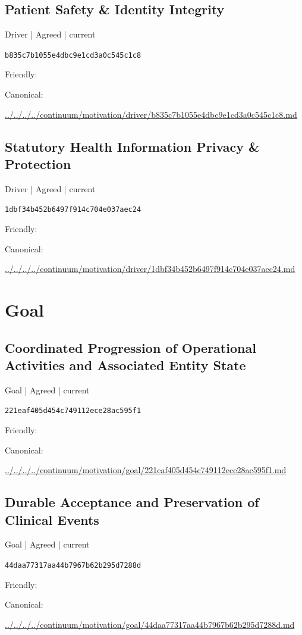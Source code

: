 \documentclass[10pt,a4paper]{article}
\begin{document}
\subsection*{Patient Safety \& Identity Integrity}
{\small Driver | Agreed | current}\par
\texttt{b835c7b1055e4dbc9e1cd3a0c545c1c8}\par
Friendly: \par
Canonical: \par
{\footnotesize\url{../../../../continuum/motivation/driver/b835c7b1055e4dbc9e1cd3a0c545c1c8.md}}\par
\subsection*{Statutory Health Information Privacy \& Protection}
{\small Driver | Agreed | current}\par
\texttt{1dbf34b452b6497f914c704e037aec24}\par
Friendly: \par
Canonical: \par
{\footnotesize\url{../../../../continuum/motivation/driver/1dbf34b452b6497f914c704e037aec24.md}}\par
\section*{Goal}
\subsection*{Coordinated Progression of Operational Activities and Associated Entity State}
{\small Goal | Agreed | current}\par
\texttt{221eaf405d454c749112ece28ac595f1}\par
Friendly: \par
Canonical: \par
{\footnotesize\url{../../../../continuum/motivation/goal/221eaf405d454c749112ece28ac595f1.md}}\par
\subsection*{Durable Acceptance and Preservation of Clinical Events}
{\small Goal | Agreed | current}\par
\texttt{44daa77317aa44b7967b62b295d7288d}\par
Friendly: \par
Canonical: \par
{\footnotesize\url{../../../../continuum/motivation/goal/44daa77317aa44b7967b62b295d7288d.md}}\par
\end{document}
